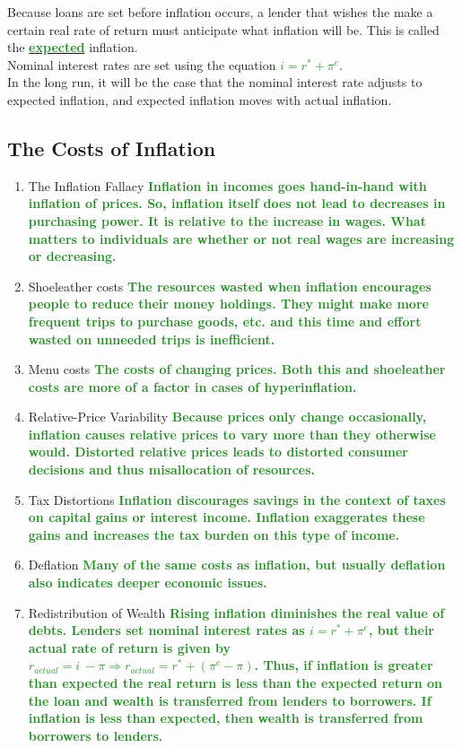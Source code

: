 \documentclass[11pt]{article}\usepackage[]{graphicx}\usepackage[]{color}
\theoremstyle{definition}
\newcommand{\blank}[1]{}
\newcommand{\ddp}[1]{{\textbf{\textcolor{ForestGreen}{#1}}}}
\newcommand{\dd}[1]{{\underline{\textbf{\textcolor{ForestGreen}{#1}}}}}
\begin{document}
Because loans are set before inflation occurs, a lender that wishes the make a certain real rate of return must anticipate what inflation will be. This is called the \dd{expected} inflation. 
\\

Nominal interest rates are set using the equation \dd{$i = r^* + \pi^e$}.
\\

In the long run, it will be the case that the nominal interest rate adjusts to expected inflation, and expected inflation moves with actual inflation.

\subsection{The Costs of Inflation}

\begin{enumerate}
	\item The Inflation Fallacy \ddp{Inflation in incomes goes hand-in-hand with inflation of prices. So, inflation itself does not lead to decreases in purchasing power. It is relative to the increase in wages. What matters to individuals are whether or not real wages are increasing or decreasing.}
	\blank{}
	\blank{}
	\item Shoeleather costs \ddp{The resources wasted when inflation encourages people to reduce their money holdings. They might make more frequent trips to purchase goods, etc. and this time and effort wasted on unneeded trips is inefficient.}
	\blank{}
	\blank{}
	\item Menu costs \ddp{The costs of changing prices. Both this and shoeleather costs are more of a factor in cases of hyperinflation.}
	\blank{}
	\blank{}
	\item Relative-Price Variability \ddp{Because prices only change occasionally, inflation causes relative prices to vary more than they otherwise would. Distorted relative prices leads to distorted consumer decisions and thus misallocation of resources.}
	\blank{}
	\blank{}
	\item Tax Distortions \ddp{Inflation discourages savings in the context of taxes on capital gains or interest income. Inflation  exaggerates these gains and increases the tax burden on this type of income.}
	\blank{}
	\blank{}
	\item Deflation \ddp{Many of the same costs as inflation, but usually deflation also indicates deeper economic issues.}
	\blank{}
	\blank{}
	\item Redistribution of Wealth \ddp{Rising inflation diminishes the real value of debts. Lenders set nominal interest rates as $i = r^* + \pi^e$, but their actual rate of return is given by $r_{actual} = i\ - \pi \Rightarrow r_{actual} = r^* + (\pi^e - \pi)$. Thus, if inflation is greater than expected the real return is less than the expected return on the loan and wealth is transferred from lenders to borrowers. If inflation is less than expected, then wealth is transferred from borrowers to lenders.}
	\blank{}
	\blank{}
\end{enumerate}
\end{document}
